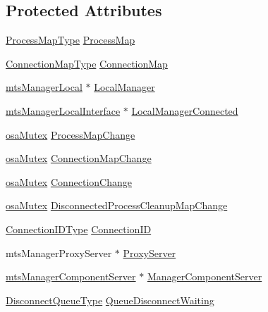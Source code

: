 \subsection*{Protected Attributes}
\begin{DoxyCompactItemize}
\item 
\hyperlink{classmts_manager_global_ab0257cb91cc9d4c59cf85706f65da9f1}{Process\-Map\-Type} \hyperlink{classmts_manager_global_a15ef83ea8929f672214f5ff8fcb9eefa}{Process\-Map}
\item 
\hyperlink{classmts_manager_global_abee7afe21ca1987b873dbfdc3ac2fbfb}{Connection\-Map\-Type} \hyperlink{classmts_manager_global_a9185c8440ca44dfc49b9b8151e8c8d64}{Connection\-Map}
\item 
\hyperlink{classmts_manager_local}{mts\-Manager\-Local} $\ast$ \hyperlink{classmts_manager_global_aedcd7068710cbb38fae05e62b5d57d10}{Local\-Manager}
\item 
\hyperlink{classmts_manager_local_interface}{mts\-Manager\-Local\-Interface} $\ast$ \hyperlink{classmts_manager_global_a3d6e45758c38a5b82664675f9f58fcc8}{Local\-Manager\-Connected}
\item 
\hyperlink{classosa_mutex}{osa\-Mutex} \hyperlink{classmts_manager_global_abd74e5301aa1eb337fe671e8cc4155b0}{Process\-Map\-Change}
\item 
\hyperlink{classosa_mutex}{osa\-Mutex} \hyperlink{classmts_manager_global_aea1c953ffed0463e90c176fd4ccf9059}{Connection\-Map\-Change}
\item 
\hyperlink{classosa_mutex}{osa\-Mutex} \hyperlink{classmts_manager_global_a925380427292023875478058d5d75842}{Connection\-Change}
\item 
\hyperlink{classosa_mutex}{osa\-Mutex} \hyperlink{classmts_manager_global_a91aa784dfa7f9a8ba3cc4f8964840032}{Disconnected\-Process\-Cleanup\-Map\-Change}
\item 
\hyperlink{mts_forward_declarations_8h_ad3543bb11742e1766374ec96016d6547}{Connection\-I\-D\-Type} \hyperlink{classmts_manager_global_a2cbe9ea56007794ec15dd0fbd10ee1a3}{Connection\-I\-D}
\item 
mts\-Manager\-Proxy\-Server $\ast$ \hyperlink{classmts_manager_global_af56265a22f5d3f13947f582ff5aa5809}{Proxy\-Server}
\item 
\hyperlink{classmts_manager_component_server}{mts\-Manager\-Component\-Server} $\ast$ \hyperlink{classmts_manager_global_af326d688537352e3106b819adfae11eb}{Manager\-Component\-Server}
\item 
\hyperlink{classmts_manager_global_a2513c197a42becaff9d23272f4a7be4b}{Disconnect\-Queue\-Type} \hyperlink{classmts_manager_global_aa3294d8f26a6bcd187db348931d788b9}{Queue\-Disconnect\-Waiting}

\end{DoxyCompactItemize}

